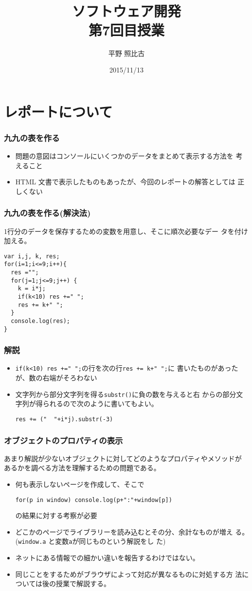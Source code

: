 \documentclass[dvipsk]{beamer}
\title{ソフトウェア開発\\第7回目授業}
\author{平野 照比古}
\institute{}
\date{2015/11/13}
\begin{document}
\frame{\maketitle}
\section{レポートについて}
\begin{frame}[containsverbatim]
 \frametitle{九九の表を作る}
 \begin{itemize}
	\item 問題の意図はコンソールにいくつかのデータをまとめて表示する方法を
				考えること
	\item HTML 文書で表示したものもあったが、今回のレポートの解答としては
				正しくない
 \end{itemize}
\end{frame}
\begin{frame}[containsverbatim]
 \frametitle{九九の表を作る(解決法)}
1行分のデータを保存するための変数を用意し、そこに順次必要なデー
				タを付け加える。
\begin{verbatim}
var i,j, k, res;
for(i=1;i<=9;i++){
  res ="";
  for(j=1;j<=9;j++) {
    k = i*j;
    if(k<10) res +=" ";
    res += k+" ";
  }
  console.log(res);
}
\end{verbatim}
\end{frame}
\begin{frame}[containsverbatim]
 \frametitle{解説}
 \begin{itemize}
	\item \texttt{if(k<10) res +=" ";}の行を次の行\texttt{res += k+" ";}に
				書いたものがあったが、数の右端がそろわない
	\item 文字列から部分文字列を得る\texttt{substr()}に負の数を与えると右
				からの部分文字列が得られるので次のように書いてもよい。

				\verb/res += /\verb*/("  "+i*j).substr(-3)/
 \end{itemize}
\end{frame}
\begin{frame}[containsverbatim]
 \frametitle{オブジェクトのプロパティの表示}
 あまり解説が少ないオブジェクトに対してどのようなプロパティやメソッドが
 あるかを調べる方法を理解するための問題である。
 \begin{itemize}
	\item 何も表示しないページを作成して、そこで

				\texttt{for(p in window) console.log(p+":"+window[p])}

				の結果に対する考察が必要
	\item どこかのページでライブラリーを読み込むとその分、余計なものが増え
				る。(\texttt{window.a} と変数\texttt{a}が同じものという解説をし
				た)
	\item ネットにある情報での細かい違いを報告するわけではない。
	\item 同じことをするためがブラウザによって対応が異なるものに対処する方
				法については後の授業で解説する。
 \end{itemize}
\end{frame}
\end{document}
